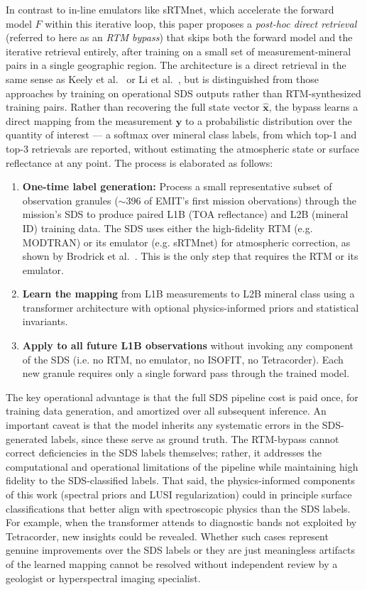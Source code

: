 \documentclass[preprint,12pt]{elsarticle}
\begin{document}
In contrast to in-line emulators like sRTMnet, which accelerate the forward model $F$ within this iterative loop, this paper proposes a \emph{post-hoc direct retrieval} (referred to here as an \emph{RTM bypass}) that skips both the forward model and the iterative retrieval entirely, after training on a small set of measurement-mineral pairs in a single geographic region.
The architecture is a direct retrieval in the same sense as Keely et al.~\cite{Keely2025ConditionalDiffusionCO2} or Li et al.~\cite{Li2022NO2NN}, but is distinguished from those approaches by training on operational SDS outputs rather than RTM-synthesized training pairs.
Rather than recovering the full state vector $\hat{\mathbf{x}}$, the bypass learns a direct mapping from the measurement $\mathbf{y}$ to a probabilistic distribution over the quantity of interest --- a softmax over mineral class labels, from which top-1 and top-3 retrievals are reported, without estimating the atmospheric state or surface reflectance at any point.
The process is elaborated as follows:
\begin{enumerate}
  \item \textbf{One-time label generation:} Process a small representative subset of observation granules ($\sim$396 of EMIT's first mission obervations) through the mission's SDS to produce paired L1B (TOA reflectance) and L2B (mineral ID) training data. 
  The SDS uses either the high-fidelity RTM (e.g. MODTRAN) or its emulator (e.g. sRTMnet) for atmospheric correction, as shown by Brodrick et al.\ \cite{brodrick2021}. 
  This is the only step that requires the RTM or its emulator.
  \item \textbf{Learn the mapping} from L1B measurements to L2B mineral class using a transformer architecture with optional physics-informed priors and statistical invariants.
  \item \textbf{Apply to all future L1B observations} without invoking any component of the SDS (i.e. no RTM, no emulator, no ISOFIT, no Tetracorder).
  Each new granule requires only a single forward pass through the trained model.
\end{enumerate}

The key operational advantage is that the full SDS pipeline cost is paid once, for training data generation, and amortized over all subsequent inference. 
An important caveat is that the model inherits any systematic errors in the SDS-generated labels, since these serve as ground truth.
The RTM-bypass cannot correct deficiencies in the SDS labels themselves; rather, it addresses the computational and operational limitations of the pipeline while maintaining high fidelity to the SDS-classified labels. 
That said, the physics-informed components of this work (spectral priors and LUSI regularization) could in principle surface classifications that better align with spectroscopic physics than the SDS labels. 
For example, when the transformer attends to diagnostic bands not exploited by Tetracorder, new insights could be revealed. 
Whether such cases represent genuine improvements over the SDS labels or they are just meaningless artifacts of the learned mapping cannot be resolved without independent review by a geologist or hyperspectral imaging specialist.
\end{document}
